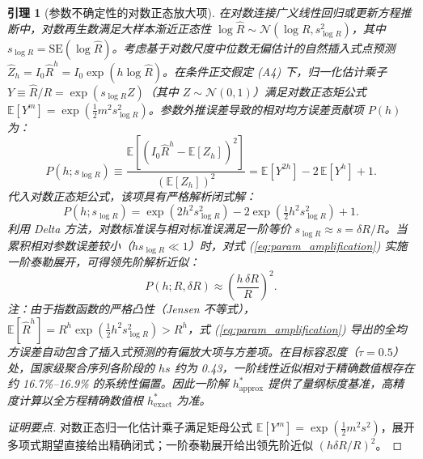\documentclass[11pt,a4paper]{article}
\theoremstyle{plain}
\newtheorem{lemma}{引理}
\theoremstyle{definition}
\begin{document}
\begin{lemma}[参数不确定性的对数正态放大项]\label{lem:param_amplification}
在对数连接广义线性回归或更新方程推断中，对数再生数满足大样本渐近正态性 $\log \hat{R} \sim \mathcal{N}(\log R, s_{\log R}^2)$，其中 $s_{\log R} = \text{SE}(\log \hat{R})$。考虑基于对数尺度中位数无偏估计的自然插入式点预测 $\hat{Z}_h = I_0 \hat{R}^h = I_0 \exp(h \log \hat{R})$。在条件正交假定 (A4) 下，归一化估计乘子 $Y \equiv \hat{R}/R = \exp(s_{\log R} Z)$（其中 $Z \sim \mathcal{N}(0, 1)$）满足对数正态矩公式 $\mathbb{E}[Y^m] = \exp(\tfrac{1}{2} m^2 s_{\log R}^2)$。参数外推误差导致的相对均方误差贡献项 $P(h)$ 为：
\begin{equation}
P(h; s_{\log R}) \equiv \frac{\mathbb{E}[(I_0 \hat{R}^h - \mathbb{E}[Z_h])^2]}{(\mathbb{E}[Z_h])^2} = \mathbb{E}\left[Y^{2h}\right] - 2\,\mathbb{E}\left[Y^{h}\right] + 1.
\end{equation}
代入对数正态矩公式，该项具有严格解析闭式解：
\begin{equation}
P(h; s_{\log R}) = \exp\!\left(2 h^2 s_{\log R}^2\right) - 2 \exp\!\left(\tfrac{1}{2} h^2 s_{\log R}^2\right) + 1.
\label{eq:param_amplification}
\end{equation}
利用 Delta 方法，对数标准误与相对标准误满足一阶等价 $s_{\log R} \approx s = \delta R / R$。当累积相对参数误差较小（$h s_{\log R} \ll 1$）时，对式 (\ref{eq:param_amplification}) 实施一阶泰勒展开，可得领先阶解析近似：
\begin{equation}
P(h; R, \delta R) \approx \left(\frac{h\,\delta R}{R}\right)^2.
\end{equation}
注：由于指数函数的严格凸性（Jensen 不等式），$\mathbb{E}[\hat{R}^h] = R^h \exp(\tfrac{1}{2}h^2 s_{\log R}^2) > R^h$，式 (\ref{eq:param_amplification}) 导出的全均方误差自动包含了插入式预测的有偏放大项与方差项。在目标容忍度（$\tau=0.5$）处，国家级聚合序列各阶段的 $h s$ 约为 0.43，一阶线性近似相对于精确数值根存在约 16.7\%--16.9\% 的系统性偏置。因此一阶解 $h^*_{\text{approx}}$ 提供了量纲标度基准，高精度计算以全方程精确数值根 $h^*_{\text{exact}}$ 为准。
\end{lemma}

\begin{proof}[证明要点]
对数正态归一化估计乘子满足矩母公式 $\mathbb{E}[Y^m]=\exp(\frac{1}{2}m^2 s^2)$，展开多项式期望直接给出精确闭式；一阶泰勒展开给出领先阶近似 $(h\delta R/R)^2$。
\end{proof}
\end{document}
